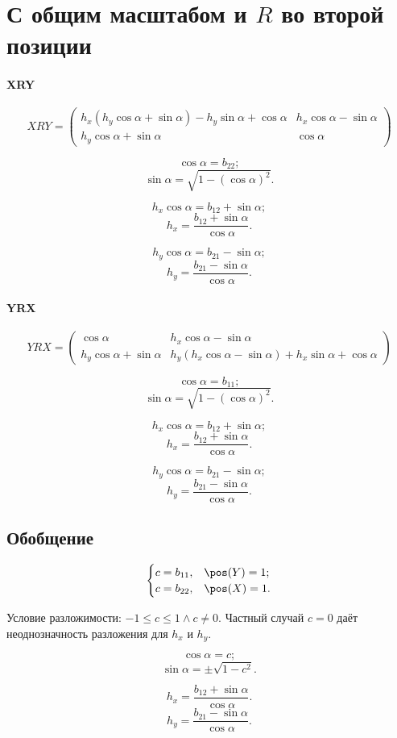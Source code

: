 \section{С общим масштабом и $R$ во второй позиции}
\paragraph{XRY}

\[
XRY =
\begin{pmatrix}
	{h_x} \left( {h_y} \cos\alpha + \sin\alpha\right) - {h_y}\sin\alpha + \cos\alpha &
	{h_x} \cos\alpha - \sin\alpha\\
	{h_y} \cos\alpha + \sin\alpha & 
	\cos\alpha
\end{pmatrix}
\]

$$\cos\alpha = b_{22};$$
$$\sin\alpha = \sqrt{1- (\cos\alpha)^2}.$$

$${h_x} \cos\alpha = b_{12} + \sin\alpha;$$
$$h_x = \frac{b_{12} + \sin\alpha}{\cos\alpha}.$$

$${h_y} \cos\alpha = b_{21} - \sin\alpha;$$ 
$$h_y = \frac{b_{21} - \sin\alpha}{\cos\alpha}.$$


\paragraph{YRX}

\[
YRX = 
\begin{pmatrix}
	\cos\alpha & 
	{h_x} \cos\alpha - \sin\alpha\\
	{h_y} \cos\alpha + \sin\alpha & 
	{h_y} \left( {h_x}\cos\alpha - \sin\alpha\right) + {h_x}\sin\alpha + \cos\alpha
\end{pmatrix}
\]

$$\cos\alpha = b_{11};$$
$$\sin\alpha = \sqrt{1- (\cos\alpha)^2}.$$

$${h_x} \cos\alpha = b_{12} + \sin\alpha;$$
$$h_x = \frac{b_{12} + \sin\alpha}{\cos\alpha}.$$

$${h_y} \cos\alpha = b_{21} - \sin\alpha;$$ 
$$h_y = \frac{b_{21} - \sin\alpha}{\cos\alpha}.$$


\subsection{Обобщение}

$$\begin{cases}
	c = b_{11}, & \pos(Y) = 1;\\
	c = b_{22}, & \pos(X) = 1.
\end{cases}$$

Условие разложимости: $-1 \le c \le 1 \wedge c \ne 0$.
Частный случай $c = 0$ даёт неоднозначность разложения для $h_x$ и $h_y$.

$$\cos\alpha = c;$$
$$\sin\alpha = \pm \sqrt{1 - c^2}.$$

$$h_x = \frac{b_{12} + \sin\alpha}{\cos\alpha}.$$
$$h_y = \frac{b_{21} - \sin\alpha}{\cos\alpha}.$$
